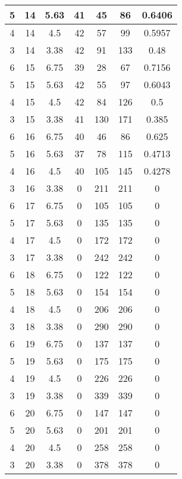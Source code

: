 \documentclass[letterpaper, 12pt]{article}
\begin{document}
\begin{longtable}{|c|c|c|c|c|c|c|}
\hline
5 & 14 & 5.63 & 41 & 45 & 86 & 0.6406 \\
\hline
4 & 14 & 4.5 & 42 & 57 & 99 & 0.5957 \\
\hline
3 & 14 & 3.38 & 42 & 91 & 133 & 0.48 \\
\hline
6 & 15 & 6.75 & 39 & 28 & 67 & 0.7156 \\
\hline
5 & 15 & 5.63 & 42 & 55 & 97 & 0.6043 \\
\hline
4 & 15 & 4.5 & 42 & 84 & 126 & 0.5 \\
\hline
3 & 15 & 3.38 & 41 & 130 & 171 & 0.385 \\
\hline
6 & 16 & 6.75 & 40 & 46 & 86 & 0.625 \\
\hline
5 & 16 & 5.63 & 37 & 78 & 115 & 0.4713 \\
\hline
4 & 16 & 4.5 & 40 & 105 & 145 & 0.4278 \\
\hline
3 & 16 & 3.38 & 0 & 211 & 211 & 0 \\
\hline
6 & 17 & 6.75 & 0 & 105 & 105 & 0 \\
\hline
5 & 17 & 5.63 & 0 & 135 & 135 & 0 \\
\hline
4 & 17 & 4.5 & 0 & 172 & 172 & 0 \\
\hline
3 & 17 & 3.38 & 0 & 242 & 242 & 0 \\
\hline
6 & 18 & 6.75 & 0 & 122 & 122 & 0 \\
\hline
5 & 18 & 5.63 & 0 & 154 & 154 & 0 \\
\hline
4 & 18 & 4.5 & 0 & 206 & 206 & 0 \\
\hline
3 & 18 & 3.38 & 0 & 290 & 290 & 0 \\
\hline
6 & 19 & 6.75 & 0 & 137 & 137 & 0 \\
\hline
5 & 19 & 5.63 & 0 & 175 & 175 & 0 \\
\hline
4 & 19 & 4.5 & 0 & 226 & 226 & 0 \\
\hline
3 & 19 & 3.38 & 0 & 339 & 339 & 0 \\
\hline
6 & 20 & 6.75 & 0 & 147 & 147 & 0 \\
\hline
5 & 20 & 5.63 & 0 & 201 & 201 & 0 \\
\hline
4 & 20 & 4.5 & 0 & 258 & 258 & 0 \\
\hline
3 & 20 & 3.38 & 0 & 378 & 378 & 0 \\
\hline
\end{longtable}
\end{document}
